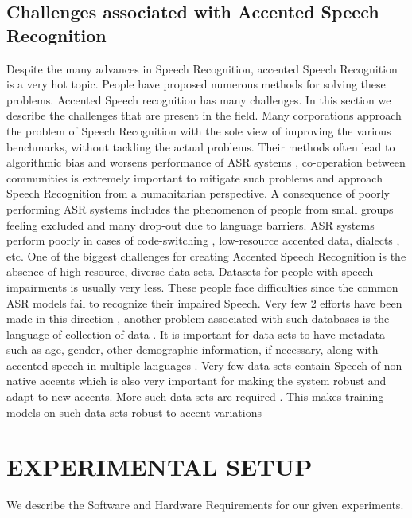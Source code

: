 \documentclass[letterpaper,12pt]{article}
\begin{document}
\subsection{Challenges associated with Accented Speech Recognition}
Despite the many advances in Speech Recognition, accented Speech Recognition is a very hot 
topic. People have proposed numerous methods for solving these problems. Accented Speech 
recognition has many challenges. In this section we describe the challenges that are present in 
the field. 
Many corporations approach the problem of Speech Recognition with the sole view of 
improving the various benchmarks, without tackling the actual problems. Their methods often 
lead to algorithmic bias and worsens performance of ASR systems \cite{markl2022language}, co-operation between 
communities is extremely important to mitigate such problems and approach Speech 
Recognition from a humanitarian perspective. A consequence of poorly performing ASR 
systems includes the phenomenon of people from small groups feeling excluded and many 
drop-out due to language barriers. ASR systems perform poorly in cases of code-switching 
\cite{vielzeuf2021e2e}, low-resource accented data, dialects \cite{aksenova2020algorithmic}, etc.
One of the biggest challenges for creating Accented Speech Recognition is the absence of 
high resource, diverse data-sets. 
Datasets for people with speech impairments is usually very less. These people face 
difficulties since the common ASR models fail to recognize their impaired Speech. Very few 
2
efforts have been made in this direction \cite{50460} \cite{kim2008dysarthric}, another problem associated with such 
databases is the language of collection of data \cite{garg2021towards}. It is important for data sets to have 
metadata such as age, gender, \cite{panayotov2015librispeech} other demographic information, if necessary, along with 
accented speech in multiple languages \cite{ardila2019common}. Very few data-sets contain Speech of non-native 
accents which is also very important for making the system robust and adapt to new accents.
More such data-sets are required \cite{aksenova2022accented}.
This makes training models on such data-sets robust to accent variations

\pagebreak

\section{EXPERIMENTAL SETUP}
We describe the Software and Hardware Requirements for our given experiments.
\end{document}
